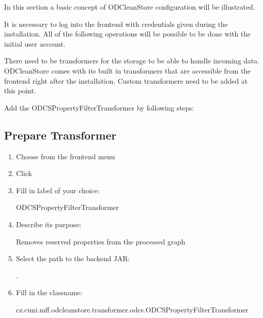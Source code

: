 In this section a basic concept of ODCleanStore configuration will be illustrated.

{

It is necessary to log into the frontend with credentials given during the installation. All of the following operations will be possible to be done with the initial user account.
}

There need to be transformers for the storage to be able to handle incoming data. ODCleanStore comes with its built in transformers that are accessible from the frontend right after the installation. Custom transformers need to be added at this point.

Add the ODCSPropertyFilterTransformer by following steps:

\subsection*{Prepare Transformer}
\label{sec:prepareTransformer}
\begin{enumerate}
	\item Choose  from the frontend menu
	\item Click 
	\item Fill in label of your choice:
	
	ODCSPropertyFilterTransformer
	
	\item Describe its purpose:
	
	Removes reserved properties from the processed graph
	
	\item Select the path to the backend JAR:
	
	.
	
	\item Fill in the classname:
	
	cz.cuni.mff.odcleanstore.transformer.odcs.ODCSPropertyFilterTransformer

\end{enumerate}

